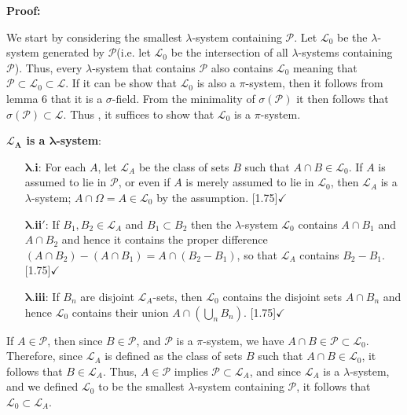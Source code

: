     \textbf{Proof: }
    \vspace{-1ex}
    \begin{proofline}
        We start by considering the smallest $\lambda$-system containing $\mathcal{P}$. Let $\mathcal{L}_0$ be the $\lambda$-system generated by $\mathcal{P}$(i.e. let $\mathcal{L}_0$ be the intersection of all $\lambda$-systems containing $\mathcal{P}$). Thus, every $\lambda$-system that contains $\mathcal{P}$ also contains $\mathcal{L}_0$ meaning that $\mathcal{P}\subset \mathcal{L}_0 \subset \mathcal{L}$. If it can be show that $\mathcal{L}_0$ is also a $\pi$-system, then it follows from lemma 6 that it is a $\sigma$-field. From the minimality of $\sigma(\mathcal{P})$ it then follows that $\sigma(\mathcal{P})\subset \mathcal{L}$. Thus , it suffices to show that $\mathcal{L}_0$ is a $\pi$-system.

        \textbf{$\boldsymbol{\mathcal{L}_A}$ is a $\boldsymbol{\lambda}$-system}:
        \vspace{-1ex}
        \begin{proofline}
             \begin{itemize}[topsep=0pt, itemsep=-3pt, itemindent=1em]
             \item[$\boldsymbol{\lambda.}$\textbf{i}:] For each $A$, let $\mathcal{L}_A$ be the class of sets $B$ such that $A\cap B \in \mathcal{L}_0$. If $A$ is assumed to lie in $\mathcal{P}$, or even if $A$ is merely assumed to lie in $\mathcal{L}_0$, then $\mathcal{L}_A$ is a $\lambda$-system; $A\cap \Omega = A \in \mathcal{L}_0$ by the assumption. \quad \scalebox{1.75}[1.75]{$\checkmark$}
             \item[$\boldsymbol{\lambda.}$\textbf{ii}$\boldsymbol{'}$:] If $B_1, B_2 \in \mathcal{L}_A$ and $B_1 \subset B_2$ then the  $\lambda$-system $\mathcal{L}_0$ contains $A\cap B_1$ and $A\cap B_2$ and hence it contains the proper difference $(A \cap B_2)-(A\cap B_1)=A\cap (B_2-B_1)$, so that $\mathcal{L}_A$ contains $B_2-B_1$.  \quad \scalebox{1.75}[1.75]{$\checkmark$}
             \item[$\boldsymbol{\lambda.}$\textbf{iii}:] If $B_n$ are disjoint $\mathcal{L}_A$-sets, then $\mathcal{L}_0$ contains the disjoint sets $A \cap B_n$ and hence $\mathcal{L}_0$ contains their union $A\cap(\bigcup_n  B_n)$.  \quad \scalebox{1.75}[1.75]{$\checkmark$}
             \end{itemize}
        \end{proofline}

        If \( A \in \mathcal{P} \), then since \( B \in \mathcal{P} \), and \( \mathcal{P} \) is a \(\pi\)-system, we have \( A \cap B \in \mathcal{P} \subset \mathcal{L}_0 \).  
        Therefore, since \( \mathcal{L}_A \) is defined as the class of sets $B$ such that $A\cap B \in \mathcal{L}_0$, it follows that \( B \in \mathcal{L}_A \). Thus, $A \in \mathcal{P}$ implies $\mathcal{P} \subset \mathcal{L}_A$, and since $\mathcal{L}_A$ is a $\lambda$-system, and we defined $\mathcal{L}_0$ to be the smallest $\lambda$-system containing $\mathcal{P}$, it follows that $\mathcal{L}_0 \subset \mathcal{L}_A$.


\end{proofline}
